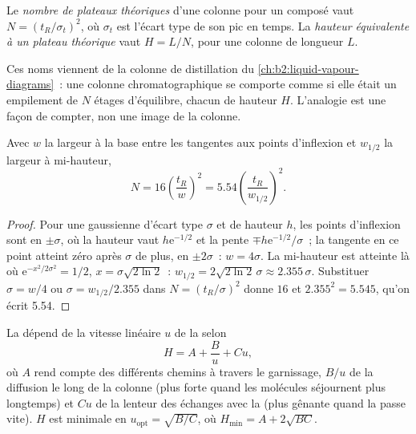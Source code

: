 \begin{definition}\label{def:b2:chromatography:plates}
Le \emph{nombre de plateaux théoriques} d'une
colonne pour un composé vaut $N = (t_R/\sigma_t)^2$, où
$\sigma_t$ est l'écart type de son pic en temps. La \emph{hauteur équivalente à un plateau
théorique} vaut
$H = L/N$, pour une colonne de longueur $L$.
\end{definition}

Ces noms viennent de la colonne de distillation du \cref{ch:b2:liquid-vapour-diagrams}~: une colonne
chromatographique se comporte comme si elle était un empilement de $N$ étages d'équilibre, chacun de
hauteur $H$. L'analogie est une façon de compter, non une image de la colonne.

\begin{proposition}\label{prop:b2:chromatography:plate-number}
Avec $w$ la largeur à la base entre les tangentes aux points d'inflexion et $w_{1/2}$ la largeur à
mi-hauteur,
\begin{equation*}
N = 16\left(\frac{t_R}{w}\right)^2 = 5.54\left(\frac{t_R}{w_{1/2}}\right)^2.
\end{equation*}
\end{proposition}

\begin{proof}
Pour une gaussienne d'écart type $\sigma$ et de hauteur $h$, les points d'inflexion sont en $\pm\sigma$,
où la hauteur vaut $h\mathrm e^{-1/2}$ et la pente $\mp h\mathrm e^{-1/2}/\sigma$~; la tangente en ce
point atteint zéro après $\sigma$ de plus, en $\pm2\sigma$~: $w = 4\sigma$. La mi-hauteur est atteinte là
où
$\mathrm e^{-x^2/2\sigma^2} = 1/2$, $x = \sigma\sqrt{2\ln2}$~: $w_{1/2} = 2\sqrt{2\ln2}\,\sigma \approx
2.355\,\sigma$. Substituer $\sigma = w/4$ ou $\sigma = w_{1/2}/2.355$ dans $N = (t_R/\sigma)^2$ donne
$16$ et $2.355^2 = 5.545$, qu'on écrit 5.54.
\end{proof}

\begin{proposition}\label{prop:b2:chromatography:van-deemter}
La  dépend de la vitesse linéaire $u$ de la  selon
\begin{equation*}
H = A + \frac{B}{u} + Cu,
\end{equation*}
où $A$ rend compte des différents chemins à travers le garnissage, $B/u$ de la diffusion le long de la
colonne (plus forte quand les molécules séjournent plus longtemps) et $Cu$ de la lenteur des échanges avec
la  (plus gênante quand la  passe vite). $H$ est minimale en $u_{\mathrm{opt}} = \sqrt{B/C}$, où $H_{\min} =
A + 2\sqrt{BC}$.
\end{proposition}

